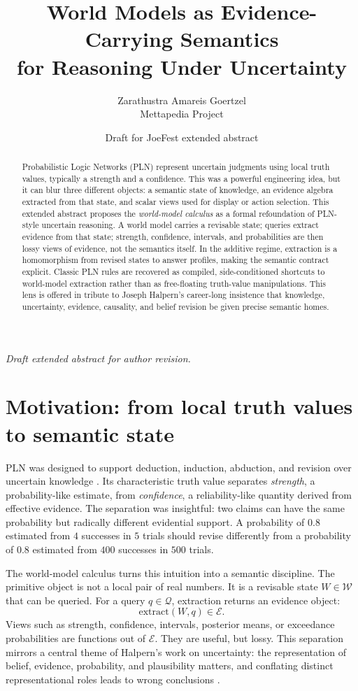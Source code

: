 \documentclass[11pt]{article}
\title{World Models as Evidence-Carrying Semantics\\for Reasoning Under Uncertainty}
\author{Zarathustra Amareis Goertzel\\\small Mettapedia Project}
\date{Draft for JoeFest extended abstract}
\newcommand{\Evidence}{\ensuremath{\mathcal{E}}}
\newcommand{\World}{\ensuremath{\mathcal{W}}}
\newcommand{\Query}{\ensuremath{\mathcal{Q}}}
\newcommand{\draftnote}{\noindent\textit{Draft extended abstract for author revision.}}
\begin{document}
\maketitle
\draftnote

\begin{abstract}
Probabilistic Logic Networks (PLN) represent uncertain judgments using local truth values, typically a strength and a confidence. This was a powerful engineering idea, but it can blur three different objects: a semantic state of knowledge, an evidence algebra extracted from that state, and scalar views used for display or action selection. This extended abstract proposes the \emph{world-model calculus} as a formal refoundation of PLN-style uncertain reasoning. A world model carries a revisable state; queries extract evidence from that state; strength, confidence, intervals, and probabilities are then lossy views of evidence, not the semantics itself. In the additive regime, extraction is a homomorphism from revised states to answer profiles, making the semantic contract explicit. Classic PLN rules are recovered as compiled, side-conditioned shortcuts to world-model extraction rather than as free-floating truth-value manipulations. This lens is offered in tribute to Joseph Halpern's career-long insistence that knowledge, uncertainty, evidence, causality, and belief revision be given precise semantic homes.
\end{abstract}

\section{Motivation: from local truth values to semantic state}

PLN was designed to support deduction, induction, abduction, and revision over uncertain knowledge \cite{GoertzelPLN2009}. Its characteristic truth value separates \emph{strength}, a probability-like estimate, from \emph{confidence}, a reliability-like quantity derived from effective evidence. The separation was insightful: two claims can have the same probability but radically different evidential support. A probability of $0.8$ estimated from $4$ successes in $5$ trials should revise differently from a probability of $0.8$ estimated from $400$ successes in $500$ trials.

The world-model calculus turns this intuition into a semantic discipline. The primitive object is not a local pair of real numbers. It is a revisable state $W \in \World$ that can be queried. For a query $q \in \Query$, extraction returns an evidence object:
\[
  \mathrm{extract}(W,q) \in \Evidence.
\]
Views such as strength, confidence, intervals, posterior means, or exceedance probabilities are functions out of \Evidence. They are useful, but lossy. This separation mirrors a central theme of Halpern's work on uncertainty: the representation of belief, evidence, probability, and plausibility matters, and conflating distinct representational roles leads to wrong conclusions \cite{Halpern2003,FaginHalpernMegiddo1990}.
\end{document}
